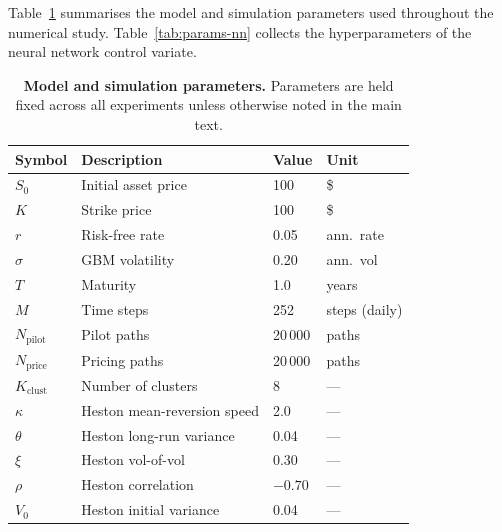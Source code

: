 Table~\ref{tab:params-model} summarises the model and simulation
parameters used throughout the numerical study.
Table~\ref{tab:params-nn} collects the hyperparameters of the
neural network control variate.

\begin{table}[H]
  \centering
  \caption{%
    \textbf{Model and simulation parameters.}
    Parameters are held fixed across all experiments unless
    otherwise noted in the main text.%
  }
  \label{tab:params-model}
  \begin{tabular}{llll}
    \toprule
    Symbol & Description & Value & Unit \\
    \midrule
    $S_0$ & Initial asset price & 100 & \$ \\
    $K$   & Strike price        & 100 & \$ \\
    $r$   & Risk-free rate      & 0.05 & ann.\ rate \\
    $\sigma$ & GBM volatility   & 0.20 & ann.\ vol \\
    $T$   & Maturity            & 1.0  & years \\
    $M$   & Time steps          & 252  & steps (daily) \\
    $N_{\text{pilot}}$  & Pilot paths & 20\,000 & paths \\
    $N_{\text{price}}$  & Pricing paths & 20\,000 & paths \\
    $K_{\text{clust}}$ & Number of clusters & 8 & --- \\
    \midrule
    $\kappa$ & Heston mean-reversion speed & 2.0  & --- \\
    $\theta$ & Heston long-run variance    & 0.04 & --- \\
    $\xi$    & Heston vol-of-vol           & 0.30 & --- \\
    $\rho$   & Heston correlation          & $-0.70$ & --- \\
    $V_0$    & Heston initial variance     & 0.04 & --- \\
    \bottomrule
  \end{tabular}
\end{table}

